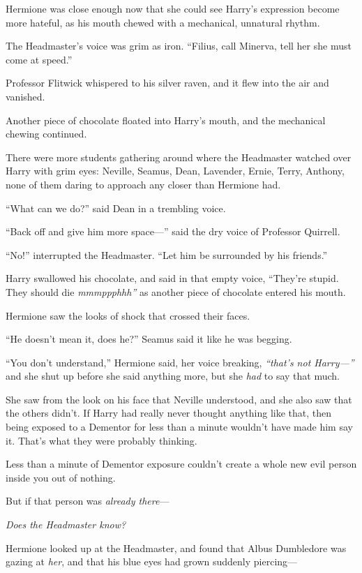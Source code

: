 Hermione was close enough now that she could see Harry's expression
become more hateful, as his mouth chewed with a mechanical, unnatural
rhythm.

The Headmaster's voice was grim as iron. ``Filius, call Minerva, tell
her she must come at speed.''

Professor Flitwick whispered to his silver raven, and it flew into the
air and vanished.

Another piece of chocolate floated into Harry's mouth, and the
mechanical chewing continued.

There were more students gathering around where the Headmaster watched
over Harry with grim eyes: Neville, Seamus, Dean, Lavender, Ernie,
Terry, Anthony, none of them daring to approach any closer than Hermione
had.

``What can we do?'' said Dean in a trembling voice.

``Back off and give him more space---'' said the dry voice of Professor
Quirrell.

``No!'' interrupted the Headmaster. ``Let him be surrounded by his
friends.''

Harry swallowed his chocolate, and said in that empty voice, ``They're
stupid. They should die \emph{mmmppphhh''} as another piece of chocolate
entered his mouth.

Hermione saw the looks of shock that crossed their faces.

``He doesn't mean it, does he?'' Seamus said it like he was begging.

``You don't understand,'' Hermione said, her voice breaking,
\emph{``that's not Harry---''} and she shut up before she said anything
more, but she \emph{had} to say that much.

She saw from the look on his face that Neville understood, and she also
saw that the others didn't. If Harry had really never thought anything
like that, then being exposed to a Dementor for less than a minute
wouldn't have made him say it. That's what they were probably thinking.

Less than a minute of Dementor exposure couldn't create a whole new evil
person inside you out of nothing.

But if that person was \emph{already there}---

\emph{Does the Headmaster know?}

Hermione looked up at the Headmaster, and found that Albus Dumbledore
was gazing at \emph{her}, and that his blue eyes had grown suddenly
piercing---

